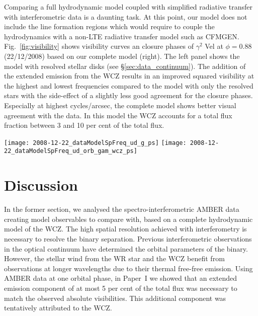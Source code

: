 \documentclass[usenatbib]{mnras}%
\begin{document}
Comparing a full hydrodynamic model coupled with simplified radiative transfer with interferometric data is a daunting task. At this point, our model does not include the line formation regions which would require to couple the hydrodynamics with a non-LTE radiative transfer model such as CFMGEN. Fig.~\ref{fig:visibility} shows visibility curves an closure phases of $\gamma^2$ Vel at $\phi=0.88$ (22/12/2008) based on our complete model (right). The left panel shows the model with resolved stellar disks (see \S\ref{sec:data_continuum}). The addition of the extended emission from the WCZ results in an improved squared visibility at the highest and lowest frequencies compared to the model with only the resolved stars with the side-effect of a slightly less good agreement for the closure phases. Especially at highest cycles/arcsec, the complete model shows better visual agreement with the data. In this model the WCZ accounts for a total flux fraction between 3 and 10 per cent of the total flux. 

%

 \begin{figure*}
   \centering
   \texttt{[image: 2008-12-22\_dataModelSpFreq\_ud\_g\_ps]}
   \texttt{[image: 2008-12-22\_dataModelSpFreq\_ud\_orb\_gam\_wcz\_ps]}\\
  \caption{Continuum visibilities and closure phases from our high-fidelity observing campaign (night of 22/12/2008) with the goemetrical model (left) and the complete model (right) superposed in black. The colors show the wavelength dependence.} 
  \label{fig:visibility}
 \end{figure*}



\section{Discussion}\label{sec:discussion}


In the former section, we analysed the spectro-interferometric AMBER data creating model observables to compare with, based on a complete hydrodynamic model of the WCZ. The high spatial resolution achieved with interferometry is necessary to resolve the binary separation.  Previous interferometric observations in the optical continuum \citep{1970MNRAS.148..103H,2007MNRAS.377..415N} have determined the orbital parameters of the binary. However, the stellar wind from the WR star and the WCZ benefit from observations at longer wavelengths due to their thermal free-free emission. Using AMBER data at one orbital phase, in Paper~I we showed that  an extended emission component of at most 5 per cent of the total flux was necessary to match the observed absolute visibilities. This additional component was tentatively attributed to the WCZ.
\end{document}

